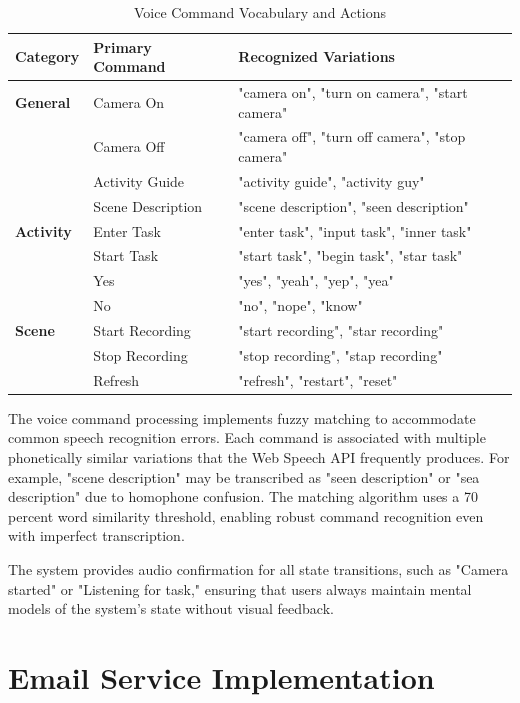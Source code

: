 \documentclass[12pt,a4paper]{report}
\begin{document}
\begin{table}[H]
\centering
\caption{Voice Command Vocabulary and Actions}
\label{tab:voice_commands}
\begin{tabular}{@{}llp{}@{}}
\toprule
\textbf{Category} & \textbf{Primary Command} & \textbf{Recognized Variations} \\ \midrule
\textbf{General} & Camera On & "camera on", "turn on camera", "start camera" \\
& Camera Off & "camera off", "turn off camera", "stop camera" \\
& Activity Guide & "activity guide", "activity guy" \\
& Scene Description & "scene description", "seen description" \\ \midrule
\textbf{Activity} & Enter Task & "enter task", "input task", "inner task" \\
& Start Task & "start task", "begin task", "star task" \\
& Yes & "yes", "yeah", "yep", "yea" \\
& No & "no", "nope", "know" \\ \midrule
\textbf{Scene} & Start Recording & "start recording", "star recording" \\
& Stop Recording & "stop recording", "stap recording" \\
& Refresh & "refresh", "restart", "reset" \\ \bottomrule
\end{tabular}
\end{table}

The voice command processing implements fuzzy matching to accommodate common speech recognition errors. Each command is associated with multiple phonetically similar variations that the Web Speech API frequently produces. For example, "scene description" may be transcribed as "seen description" or "sea description" due to homophone confusion. The matching algorithm uses a 70 percent word similarity threshold, enabling robust command recognition even with imperfect transcription.

The system provides audio confirmation for all state transitions, such as "Camera started" or "Listening for task," ensuring that users always maintain mental models of the system's state without visual feedback.

\section{Email Service Implementation}
\end{document}
